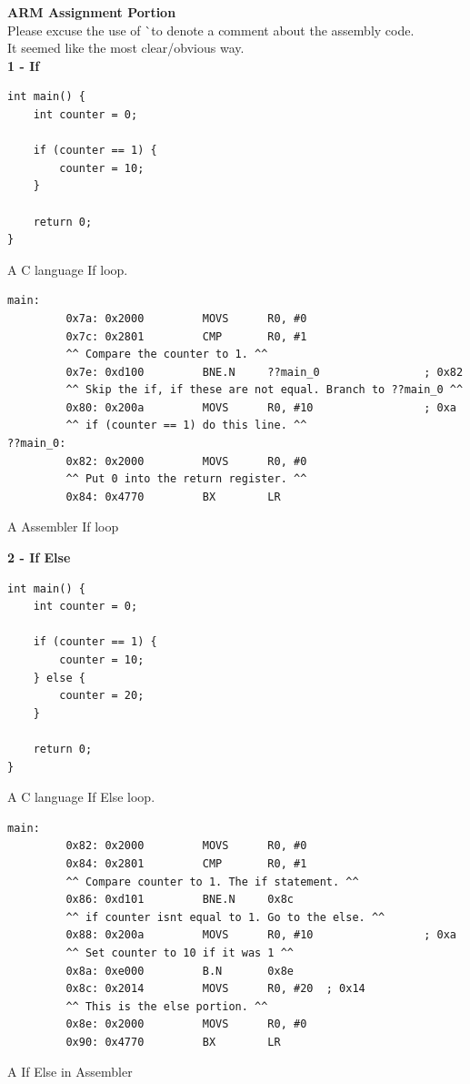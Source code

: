 \documentclass[12pt,a4paper]{report}
\begin{document}
\begin{normalsize}
\textbf{ARM Assignment Portion} \\
Please excuse the use of ^^ to denote a comment about the assembly code. \\
It seemed like the most clear/obvious way. \\

\textbf{1 - If} \\

\lstset{language=C}
\begin{lstlisting}
int main() {
    int counter = 0;

	if (counter == 1) {
		counter = 10;
	}

    return 0;
}
\end{lstlisting}	
\begin{center}
\small{A C language If loop.}
\end{center}

\lstset{language=[x86masm]Assembler}
\begin{lstlisting}
main:
         0x7a: 0x2000         MOVS      R0, #0
         0x7c: 0x2801         CMP       R0, #1 
         ^^ Compare the counter to 1. ^^
         0x7e: 0xd100         BNE.N     ??main_0                ; 0x82 
         ^^ Skip the if, if these are not equal. Branch to ??main_0 ^^
         0x80: 0x200a         MOVS      R0, #10                 ; 0xa
         ^^ if (counter == 1) do this line. ^^
??main_0:
         0x82: 0x2000         MOVS      R0, #0 
         ^^ Put 0 into the return register. ^^
         0x84: 0x4770         BX        LR
\end{lstlisting}	
\begin{center}
\small{A Assembler If loop}
\end{center}


\textbf{2 - If Else} \\

\lstset{language=C}
\begin{lstlisting}
int main() {
    int counter = 0;

	if (counter == 1) {
		counter = 10;
	} else {
		counter = 20;
	}

    return 0;
}
\end{lstlisting}	
\begin{center}
\small{A C language If Else loop.}
\end{center}

\lstset{language=[x86masm]Assembler}
\begin{lstlisting}
main:
         0x82: 0x2000         MOVS      R0, #0
         0x84: 0x2801         CMP       R0, #1 
         ^^ Compare counter to 1. The if statement. ^^
         0x86: 0xd101         BNE.N     0x8c 
         ^^ if counter isnt equal to 1. Go to the else. ^^
         0x88: 0x200a         MOVS      R0, #10                 ; 0xa
         ^^ Set counter to 10 if it was 1 ^^
         0x8a: 0xe000         B.N       0x8e
         0x8c: 0x2014         MOVS      R0, #20  ; 0x14 
         ^^ This is the else portion. ^^
         0x8e: 0x2000         MOVS      R0, #0
         0x90: 0x4770         BX        LR
\end{lstlisting}	
\begin{center}
\small{A If Else in Assembler}
\end{center}



\end{normalsize}
\end{document}
